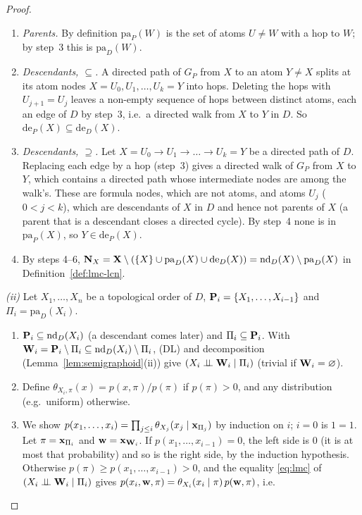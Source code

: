 \documentclass{article} %
\newcommand{\indep}{\perp\!\!\!\perp}
\newcommand{\pa}{\mathrm{pa}}
\begin{document}
\begin{proof}
\begin{enumerate}
  hop.
  \item \emph{Parents.} By definition $\pa_P(W)$ is the set of atoms $U\neq W$
  with a hop to $W$; by step~3 this is $\pa_D(W)$.
  \item \emph{Descendants, $\subseteq$.} A directed path of $G_P$ from $X$ to an
  atom $Y\neq X$ splits at its atom nodes $X=U_0,U_1,\dots,U_k=Y$ into hops.
  Deleting the hops with $U_{j+1}=U_j$ leaves a non-empty sequence of hops
  between distinct atoms, each an edge of $D$ by step~3, i.e.\ a directed walk
  from $X$ to $Y$ in $D$. So $\mathrm{de}_P(X)\subseteq\mathrm{de}_D(X)$.
  \item \emph{Descendants, $\supseteq$.} Let $X=U_0\to U_1\to\dots\to U_k=Y$ be a
  directed path of $D$. Replacing each edge by a hop (step~3) gives a directed
  walk of $G_P$ from $X$ to $Y$, which contains a directed path whose
  intermediate nodes are among the walk's. These are formula nodes, which are not
  atoms, and atoms $U_j$ ($0<j<k$), which are descendants of $X$ in $D$ and hence
  not parents of $X$ (a parent that is a descendant closes a directed cycle). By
  step~4 none is in $\pa_P(X)$, so $Y\in\mathrm{de}_P(X)$.
  \item By steps 4--6, $\bN_X=\bX\setminus(\{X\}\cup\pa_D(X)\cup\mathrm{de}_D(X))=\mathrm{nd}_D(X)\setminus\pa_D(X)$
  in Definition~\ref{def:lmc-lcn}.
\end{enumerate}
\emph{(ii)} Let $X_1,\dots,X_n$ be a topological order of $D$, $\mathbf{P}_i=\{X_1,\dots,X_{i-1}\}$
and $\Pi_i=\pa_D(X_i)$.
\begin{enumerate}
  \item $\mathbf{P}_i\subseteq\mathrm{nd}_D(X_i)$ (a descendant comes later) and
  $\Pi_i\subseteq\mathbf{P}_i$. With $\mathbf{W}_i=\mathbf{P}_i\setminus\Pi_i\subseteq\mathrm{nd}_D(X_i)\setminus\Pi_i$,
  (DL) and decomposition (Lemma~\ref{lem:semigraphoid}(ii)) give
  $(X_i\indep\bW_i\mid\Pi_i)$ (trivial if $\mathbf{W}_i=\varnothing$).
  \item Define $\theta_{X_i,\pi}(x)=p(x,\pi)/p(\pi)$ if $p(\pi)>0$, and any
  distribution (e.g.\ uniform) otherwise.
  \item We show $p(x_1,\dots,x_i)=\prod_{j\le i}\theta_{X_j}(x_j\mid\mathbf{x}_{\Pi_j})$ by
  induction on $i$; $i=0$ is $1=1$. Let $\pi=\mathbf{x}_{\Pi_i}$ and $\mathbf{w}=\mathbf{x}_{\mathbf{W}_i}$.
  If $p(x_1,\dots,x_{i-1})=0$, the left side is $0$ (it is at most that
  probability) and so is the right side, by the induction hypothesis. Otherwise
  $p(\pi)\ge p(x_1,\dots,x_{i-1})>0$, and the equality \eqref{eq:lmc} of
  $(X_i\indep\bW_i\mid\Pi_i)$ gives
  $p(x_i,\mathbf{w},\pi)=\theta_{X_i}(x_i\mid\pi)\,p(\mathbf{w},\pi)$, i.e.\

\end{enumerate}
\end{proof}
\end{document}
